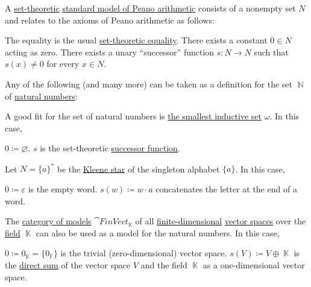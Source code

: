 \begin{example}\label{ex:natural_numbers_models}
  A \hyperref[sec:set_theory]{set-theoretic} \hyperref[def:peano_arithmetic]{standard model of Peano arithmetic} consists of a nonempty set \( N \) and relates to the axioms of Peano arithmetic as follows:
  \begin{refenum}
     The equality is the usual \hyperref[def:set]{set-theoretic equality}.
     There exists a constant \( 0 \in N \) acting as zero.
     There exists a unary \enquote{successor} function \( s: N \to N \) such that \( s(x) \neq 0 \) for every \( x \in N \).
  \end{refenum}

  Any of the following (and many more) can be taken as a definition for the set \( \BbbN \) of \hyperref[def:set_of_natural_numbers]{natural numbers}:
  \begin{thmenum}
     A good fit for the set of natural numbers is \hyperref[def:smallest_inductive_set]{the smallest inductive set} \( \omega \). In this case,
    \begin{refenum}
       \( 0 \coloneqq \varnothing \).
       \( s \) is the set-theoretic \hyperref[def:basic_set_operations/successor]{successor function}.
    \end{refenum}

     Let \( N = \{ a \}^{*} \) be the \hyperref[def:language/kleene_star]{Kleene star} of the singleton alphabet \( \{ a \} \). In this case,
    \begin{refenum}
       \( 0 \coloneqq \varepsilon \) is the empty word.
       \( s(w) \coloneqq w \cdot a \) concatenates the letter at the end of a word.
    \end{refenum}

     The \hyperref[def:category_of_first_order_models]{category of models} \( \cat{FinVect}_{\BbbK} \) of all \hyperref[def:vector_space_dimension]{finite-dimensional} \hyperref[def:vector_space]{vector spaces} over the \hyperref[def:field]{field} \( \BbbK \) can also be used as a model for the natural numbers. In this case,
    \begin{refenum}
       \( 0 \coloneqq 0_{\BbbK} = \{ 0_{\BbbF} \} \) is the trivial (zero-dimensional) vector space.
       \( s(V) \coloneqq V \oplus \BbbK \) is the \hyperref[def:left_module_direct_product]{direct sum} of the vector space \( V \) and the field \( \BbbK \) as a one-dimensional vector space.
    \end{refenum}
  \end{thmenum}
\end{example}

